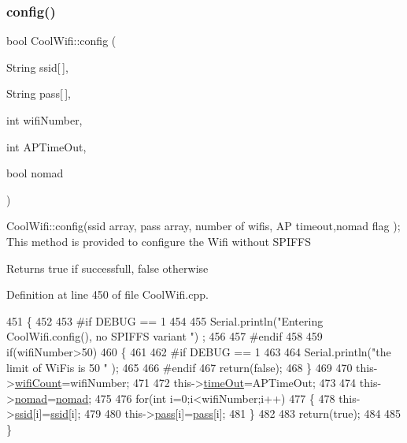 \subsubsection{\texorpdfstring{config()}{config()}\hspace{0.1cm}{\footnotesize\ttfamily [2/2]}}
{\footnotesize\ttfamily bool Cool\+Wifi\+::config (\begin{DoxyParamCaption}\item[{String}]{ssid\mbox{[}$\,$\mbox{]},  }\item[{String}]{pass\mbox{[}$\,$\mbox{]},  }\item[{int}]{wifi\+Number,  }\item[{int}]{A\+P\+Time\+Out,  }\item[{bool}]{nomad }\end{DoxyParamCaption})}

Cool\+Wifi\+::config(ssid array, pass array, number of wifis, A\+P timeout,nomad flag ); This method is provided to configure the Wifi without S\+P\+I\+F\+FS

\begin{DoxyReturn}{Returns}
true if successfull, false otherwise 
\end{DoxyReturn}


Definition at line 450 of file Cool\+Wifi.\+cpp.


\begin{DoxyCode}
451 \{
452 
453 \textcolor{preprocessor}{#if DEBUG == 1 }
454     
455     Serial.println(\textcolor{stringliteral}{"Entering CoolWifi.config(), no SPIFFS variant "}) ;
456     
457 \textcolor{preprocessor}{#endif}
458     
459     \textcolor{keywordflow}{if}(wifiNumber>50)
460     \{
461     
462 \textcolor{preprocessor}{    #if DEBUG == 1 }
463         
464         Serial.println(\textcolor{stringliteral}{"the limit of WiFis is 50 "} );
465         
466 \textcolor{preprocessor}{    #endif}
467         \textcolor{keywordflow}{return}(\textcolor{keyword}{false});  
468     \}
469 
470     this->\hyperlink{class_cool_wifi_ab133bd92fcb895b884deecd6678592e4}{wifiCount}=wifiNumber;
471 
472     this->\hyperlink{class_cool_wifi_a952111605f25156588b5632caaba1c6f}{timeOut}=APTimeOut;
473 
474     this->\hyperlink{class_cool_wifi_ab7d9643c4af7bac3be331ef008b2ea27}{nomad}=\hyperlink{class_cool_wifi_ab7d9643c4af7bac3be331ef008b2ea27}{nomad};
475     
476     \textcolor{keywordflow}{for}(\textcolor{keywordtype}{int} i=0;i<wifiNumber;i++)
477     \{
478         this->\hyperlink{class_cool_wifi_a893b21d0fed821438733bba2e73fb4c2}{ssid}[i]=\hyperlink{class_cool_wifi_a893b21d0fed821438733bba2e73fb4c2}{ssid}[i];
479         
480         this->\hyperlink{class_cool_wifi_a0c3332a149245aaad060b32593a54c9b}{pass}[i]=\hyperlink{class_cool_wifi_a0c3332a149245aaad060b32593a54c9b}{pass}[i];
481     \}
482         
483     \textcolor{keywordflow}{return}(\textcolor{keyword}{true});
484 
485 \}
\end{DoxyCode}
\mbox{\label{class_cool_wifi_ad060353050f40d032a2dbf9e54a768bf}} 
